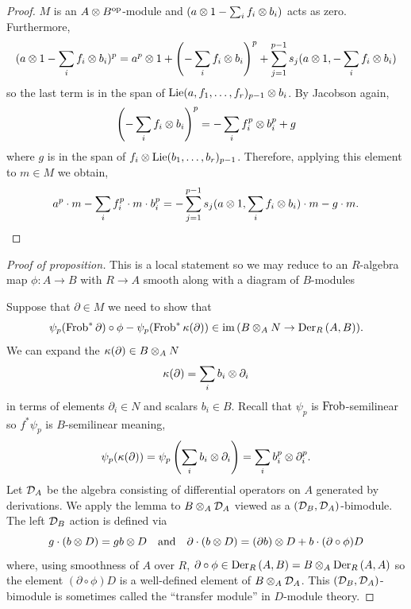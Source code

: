 \documentclass[main.tex]{subfiles}
\begin{document}
\begin{proof}
$M$ is an $A \ot B^\op$-module and $(a \ot 1 - \sum_i f_i \ot b_i)$ acts as zero. Furthermore,
\[ (a \ot 1 - \sum_i f_i \ot b_i)^p = a^p \ot 1 + \left(- \sum_i f_i \ot b_i \right)^p + \sum_{j = 1}^{p-1} s_j(a \ot 1, -\sum_i f_i \ot b_i) \]
so the last term is in the span of $\Lie(a, f_1, \dots, f_r)_{p-1} \ot b_i$. By Jacobson again,
\[  \left(- \sum_i f_i \ot b_i \right)^p = - \sum_i f_i^p \ot b_i^p + g \]
where $g$ is in the span of $f_i \ot \Lie(b_1, \dots, b_r)_{p-1}$. Therefore, applying this element to $m \in M$ we obtain,
\[ a^p \cdot m - \sum_i f_i^p \cdot m \cdot b_i^p = -\sum_{j = 1}^{p-1} s_j(a \ot 1, \sum_i f_i \ot b_i) \cdot m  -g \cdot m. \]
\end{proof}



\begin{proof}[Proof of proposition]
This is a local statement so we may reduce to an $R$-algebra map $\phi : A \to B$ with $R \to A$ smooth along with a diagram of $B$-modules
\begin{center}
\end{center}
Suppose that $\partial \in M$ we need to show that 
\[ \psi_p(\Frob^* \partial) \circ \phi - \psi_p(\Frob^* \kappa(\partial)) \in \im{( B \ot_A N \to \Der[R]{A}{B})}. \] 
We can expand the $\kappa(\partial) \in B \ot_A N$ 
\[ \kappa(\partial) = \sum_i b_i \ot \partial_i \]
in terms of elements $\partial_i \in N$ and scalars $b_i \in B$. Recall that $\psi_p$ is $\Frob$-semilinear so $f^* \psi_p$ is $B$-semilinear meaning,
\[ \psi_p(\kappa(\partial)) = \psi_p \left(\sum_i b_i \ot \partial_i \right) = \sum_i b_i^p \ot \partial_i^p. \]
Let $\D_A$ be the algebra consisting of differential operators on $A$ generated by derivations. We apply the lemma to $B \ot_A \D_A$ viewed as a $(\D_B, \D_A)$-bimodule. The left $\D_B$ action is defined via
\[ g \cdot (b \ot D) = gb \ot D \quad \text{and} \quad \partial \cdot (b \ot D) = (\partial b) \ot D + b \cdot (\partial \circ \phi) D \]
where, using smoothness of $A$ over $R$, $\partial \circ \phi \in \Der[R]{A}{B} = B \ot_A \Der[R]{A}{A}$ so the element $(\partial \circ \phi) D$ is a well-defined element of $B \ot_A \D_A$. This $(\D_B, \D_A)$-bimodule is sometimes called the ``transfer module'' in $D$-module theory.

\end{proof}
\end{document}
